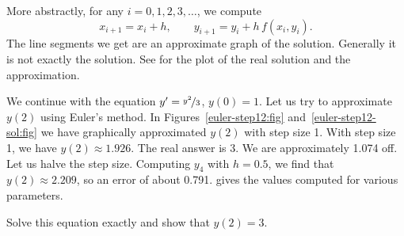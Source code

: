 \begin{myfig}
\capstart
\caption{First two steps of Euler's method with $h=1$ for
the equation $y' = \frac{y^2}{3}$ with initial conditions $y(0)=1$.%
\label{euler-step12:fig}}
\end{myfig}

More abstractly, for any $i=0,1,2,3,\ldots$, we compute
\begin{equation*}
x_{i+1} = x_i + h , \qquad y_{i+1}  = y_i + h\, f(x_i,y_i) .
\end{equation*}
The line segments we get are an
approximate graph of the solution.
Generally it is not exactly the solution.  See
 for the plot of the real solution
and the approximation.

\begin{myfig}
\capstart
{}
\caption{Two steps of Euler's method (step size 1) and the exact solution for
the equation $y' = \frac{y^2}{3}$ with initial conditions $y(0)=1$.
%
\label{euler-step12-sol:fig}}
\end{myfig}

We continue with the equation $y' = \nicefrac{y^2}{3}$, $y(0)=1$.
Let us try
to approximate $y(2)$ using Euler's method.  In
Figures~\ref{euler-step12:fig}
and~\ref{euler-step12-sol:fig} we have 
graphically approximated $y(2)$ with step size 1.  With step
size 1, we have $y(2) \approx 1.926$.  The real
answer is 3.  We are approximately 1.074
off.  Let us halve the step size.
Computing $y_4$ with $h=0.5$,
we find that $y(2) \approx 2.209$, so an error of about 0.791.
 gives the values computed
for various parameters.

\begin{exercise}
Solve this equation exactly and show that $y(2) = 3$.
\end{exercise}

